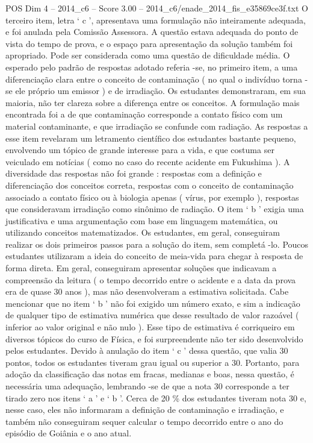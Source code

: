 \begin{textsample}{POS Dim 4 – 2014\_c6 – Score 3.00 – 2014\_c6/enade\_2014\_fis\_e35869ce3f.txt}
O terceiro item, letra ‘ c ’, apresentava uma formulação não inteiramente adequada, e foi anulada pela Comissão Assessora.
A questão estava adequada do ponto de vista do tempo de prova, e o espaço para apresentação da solução também foi apropriado.
Pode ser considerada como uma questão de dificuldade média.
O esperado pelo padrão de respostas adotado referia -se, no primeiro item, a uma diferenciação clara entre o conceito de contaminação ( no qual o indivíduo torna -se ele próprio um emissor ) e de irradiação.
Os estudantes demonstraram, em sua maioria, não ter clareza sobre a diferença entre os conceitos.
A formulação mais encontrada foi a de que contaminação corresponde a contato físico com um material contaminante, e que irradiação se confunde com radiação.
As respostas a esse item revelaram um letramento científico dos estudantes bastante pequeno, envolvendo um tópico de grande interesse para a vida, e que costuma ser veiculado em notícias ( como no caso do recente acidente em Fukushima ).
A diversidade das respostas não foi grande : respostas com a definição e diferenciação dos conceitos correta, respostas com o conceito de contaminação associado a contato físico ou à biologia apenas ( vírus, por exemplo ), respostas que consideravam irradiação como sinônimo de radiação.
O item ‘ b ’ exigia uma justificativa e uma argumentação com base em linguagem matemática, ou utilizando conceitos matematizados.
Os estudantes, em geral, conseguiram realizar os dois primeiros passos para a solução do item, sem completá -lo.
Poucos estudantes utilizaram a ideia do conceito de meia-vida para chegar à resposta de forma direta.
Em geral, conseguiram apresentar soluções que indicavam a compreensão da leitura ( o tempo decorrido entre o acidente e a data da prova era de quase 30 anos ), mas não desenvolveram a estimativa solicitada.
Cabe mencionar que no item ‘ b ’ não foi exigido um número exato, e sim a indicação de qualquer tipo de estimativa numérica que desse resultado de valor razoável ( inferior ao valor original e não nulo ).
Esse tipo de estimativa é corriqueiro em diversos tópicos do curso de Física, e foi surpreendente não ter sido desenvolvido pelos estudantes.
Devido à anulação do item ‘ c ’ dessa questão, que valia 30 pontos, todos os estudantes tiveram grau igual ou superior a 30.
Portanto, para adoção da classificação das notas em fracas, medianas e boas, nessa questão, é necessária uma adequação, lembrando -se de que a nota 30 corresponde a ter tirado zero nos itens ‘ a ’ e ‘ b ’.
Cerca de 20 \% dos estudantes tiveram nota 30 e, nesse caso, eles não informaram a definição de contaminação e irradiação, e também não conseguiram sequer calcular o tempo decorrido entre o ano do episódio de Goiânia e o ano atual.

\end{textsample}
